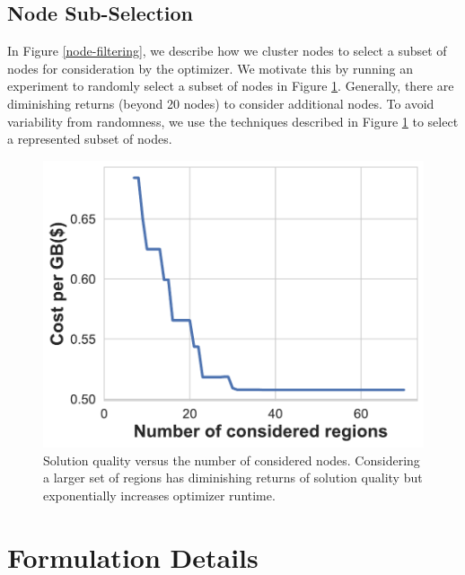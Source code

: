 \subsection{Node Sub-Selection}
In Figure \ref{node-filtering}, we describe how we cluster nodes to select a subset of nodes for consideration by the optimizer. We motivate this by running an experiment to randomly select a subset of nodes in Figure \ref{fig:node_selection}. Generally, there are diminishing returns (beyond 20 nodes) to consider additional nodes. To avoid variability from randomness, we use the techniques described in  Figure \ref{fig:node_selection} to select a represented subset of nodes. 

\begin{figure}[ht]
     \includegraphics[width=.65\linewidth]{figures/node_sensitivity.pdf}
     \caption{Solution quality versus the number of considered nodes. Considering a larger set of regions has diminishing returns of solution quality but exponentially increases optimizer runtime. }
     \label{fig:node_selection}
\end{figure}


\section{Formulation Details}
\label{s:formulation-details}

